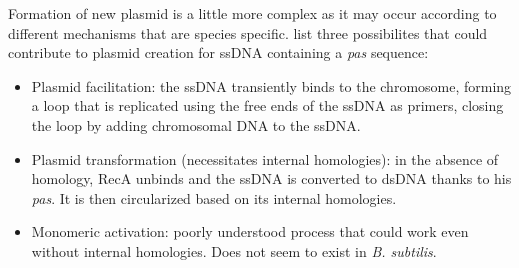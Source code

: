 Formation of new plasmid is a little more complex as it may occur according to different mechanisms that are species specific. \citet{kidane_cell_2012} list three possibilites that could contribute to plasmid creation for ssDNA containing a \textit{pas} sequence:
\begin{itemize}
	\item Plasmid facilitation: the ssDNA transiently binds to the chromosome, forming a loop that is replicated using the free ends of the ssDNA as primers, closing the loop by adding chromosomal DNA to the ssDNA.
	\item Plasmid transformation (necessitates internal homologies): in the absence of homology, RecA unbinds and the ssDNA is converted to dsDNA thanks to his \textit{pas}. It is then circularized based on its internal homologies.
	\item Monomeric activation: poorly understood process that could work even without internal homologies. Does not seem to exist in \textit{B. subtilis}.
\end{itemize}
